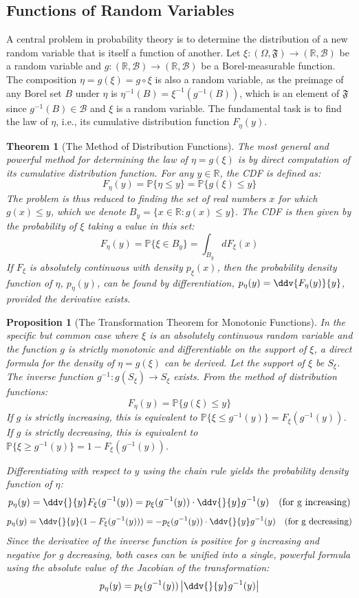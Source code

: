 \documentclass[12pt, openany]{book}
\theoremstyle{definition}
\theoremstyle{plain}
\newtheorem{theorem}[definition]{Theorem}
\newtheorem{proposition}[definition]{Proposition}
\theoremstyle{remark}
\newcommand{\R}{\mathbb{R}}
\newcommand{\B}{\mathcal{B}}
\newcommand{\probP}{\mathbb{P}}
\newcommand{\germF}{\mathfrak{F}} %
\begin{document}
\subsection{Functions of Random Variables}
A central problem in probability theory is to determine the distribution of a new random variable that is itself a function of another. Let $\xi: (\Omega, \germF) \to (\R, \B)$ be a random variable and $g: (\R, \B) \to (\R, \B)$ be a Borel-measurable function. The composition $\eta = g(\xi) = g \circ \xi$ is also a random variable, as the preimage of any Borel set $B$ under $\eta$ is $\eta^{-1}(B) = \xi^{-1}(g^{-1}(B))$, which is an element of $\germF$ since $g^{-1}(B) \in \B$ and $\xi$ is a random variable. The fundamental task is to find the law of $\eta$, i.e., its cumulative distribution function $F_\eta(y)$.

\begin{theorem}[The Method of Distribution Functions]
The most general and powerful method for determining the law of $\eta=g(\xi)$ is by direct computation of its cumulative distribution function. For any $y \in \R$, the CDF is defined as:
$$ F_\eta(y) = \probP\{\eta \le y\} = \probP\{g(\xi) \le y\} $$
The problem is thus reduced to finding the set of real numbers $x$ for which $g(x) \le y$, which we denote $B_y = \{x \in \R : g(x) \le y\}$. The CDF is then given by the probability of $\xi$ taking a value in this set:
$$ F_\eta(y) = \probP\{\xi \in B_y\} = \int_{B_y} dF_\xi(x) $$
If $F_\xi$ is absolutely continuous with density $p_\xi(x)$, then the probability density function of $\eta$, $p_\eta(y)$, can be found by differentiation, $p_\eta(y) = \ddv{F_\eta(y)}{y}$, provided the derivative exists.
\end{theorem}

\begin{proposition}[The Transformation Theorem for Monotonic Functions]
In the specific but common case where $\xi$ is an absolutely continuous random variable and the function $g$ is strictly monotonic and differentiable on the support of $\xi$, a direct formula for the density of $\eta=g(\xi)$ can be derived. Let the support of $\xi$ be $S_\xi$.
The inverse function $g^{-1}: g(S_\xi) \to S_\xi$ exists. From the method of distribution functions:
$$ F_\eta(y) = \probP\{g(\xi) \le y\} $$
If $g$ is strictly increasing, this is equivalent to $\probP\{\xi \le g^{-1}(y)\} = F_\xi(g^{-1}(y))$.
If $g$ is strictly decreasing, this is equivalent to $\probP\{\xi \ge g^{-1}(y)\} = 1 - F_\xi(g^{-1}(y))$.

Differentiating with respect to $y$ using the chain rule yields the probability density function of $\eta$:
$$ p_\eta(y) = \ddv{}{y} F_\xi(g^{-1}(y)) = p_\xi(g^{-1}(y)) \cdot \ddv{}{y}g^{-1}(y) \quad (\text{for g increasing}) $$
$$ p_\eta(y) = \ddv{}{y} (1 - F_\xi(g^{-1}(y))) = -p_\xi(g^{-1}(y)) \cdot \ddv{}{y}g^{-1}(y) \quad (\text{for g decreasing}) $$
Since the derivative of the inverse function is positive for g increasing and negative for g decreasing, both cases can be unified into a single, powerful formula using the absolute value of the Jacobian of the transformation:
$$ p_\eta(y) = p_\xi(g^{-1}(y)) \left| \ddv{}{y}g^{-1}(y) \right| $$
\end{proposition}
\end{document}
